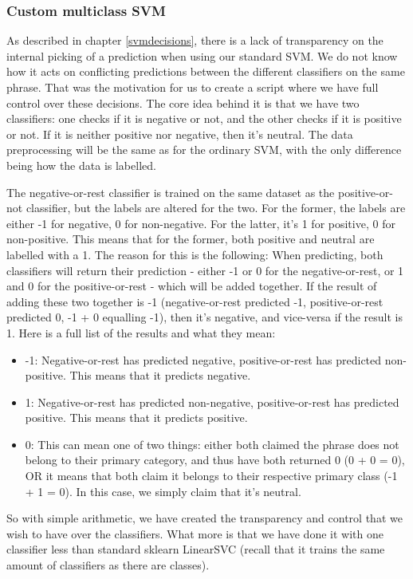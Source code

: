 \subsubsection{Custom multiclass SVM}
As described in chapter \ref{svmdecisions}, there is a lack of transparency on the internal picking of a prediction when using our standard SVM. We do not know how it acts on conflicting predictions between the different classifiers on the same phrase. That was the motivation for us to create a script where we have full control over these decisions. The core idea behind it is that we have two classifiers: one checks if it is negative or not, and the other checks if it is positive or not. If it is neither positive nor negative, then it’s neutral. The data preprocessing will be the same as for the ordinary SVM, with the only difference being how the data is labelled.

The negative-or-rest classifier is trained on the same dataset as the positive-or-not classifier, but the labels are altered for the two. For the former, the labels are either -1 for negative, 0 for non-negative. For the latter, it’s 1 for positive, 0 for non-positive. This means that for the former, both positive and neutral are labelled with a 1.
The reason for this is the following:
When predicting, both classifiers will return their prediction - either -1 or 0 for the negative-or-rest, or 1 and 0 for the positive-or-rest -  which will be added together.
If the result of adding these two together is -1 (negative-or-rest predicted -1, positive-or-rest predicted 0, -1 + 0 equalling -1), then it’s negative, and vice-versa if the result is 1.
Here is a full list of the results and what they mean:
\begin{itemize}
    \item -1: Negative-or-rest has predicted negative, positive-or-rest has predicted non-positive. This means that it predicts negative.
    \item 1: Negative-or-rest has predicted non-negative, positive-or-rest has predicted positive. This means that it predicts positive.
    \item 0: This can mean one of two things: either both claimed the phrase does not belong to their primary category, and thus have both returned 0 (0 + 0 = 0), OR it means that both claim it belongs to their respective primary class (-1 + 1 = 0). In this case, we simply claim that it’s neutral.
\end{itemize}
So with simple arithmetic, we have created the transparency and control that we wish to have over the classifiers. What more is that we have done it with one classifier less than standard sklearn LinearSVC (recall that it trains the same amount of classifiers as there are classes).

